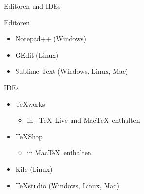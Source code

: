 \begin{Frame}{Editoren und IDEs}
  \begin{Block}{Editoren}
    \begin{itemize}
      \item Notepad++ (Windows)
      \item GEdit (Linux)
      \item Sublime Text (Windows, Linux, Mac)
    \end{itemize}
  \end{Block}

  \pause

  \begin{Block}{IDEs}
    \begin{itemize}
      \item \TeX works
        \begin{itemize}
          \item in \MiKTeX, \TeX\ Live und Mac\TeX\ enthalten
        \end{itemize}
      \item \TeX Shop
        \begin{itemize}
          \item in Mac\TeX\ enthalten
        \end{itemize}
      \item Kile (Linux)
      \item TeXstudio (Windows, Linux, Mac)
    \end{itemize}
  \end{Block}
\end{Frame}


\malte


